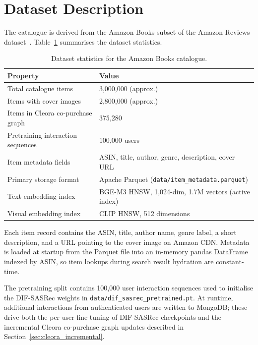\section{Dataset Description}
\label{sec:app_dataset}

The catalogue is derived from the Amazon Books subset of the Amazon Reviews dataset~\cite{ni2019justifying}.
Table~\ref{tab:app_dataset_stats} summarises the dataset statistics.

\begin{table}[H]
\centering
\caption{Dataset statistics for the Amazon Books catalogue.}
\label{tab:app_dataset_stats}
\begin{tabular}{p{6.5cm} p{8.0cm}}
\hline
\textbf{Property} & \textbf{Value} \\
\hline
Total catalogue items & 3{,}000{,}000 (approx.) \\
Items with cover images & 2{,}800{,}000 (approx.) \\
Items in Cleora co-purchase graph & 375{,}280 \\
Pretraining interaction sequences & 100{,}000 users \\
Item metadata fields & ASIN, title, author, genre, description, cover URL \\
Primary storage format & Apache Parquet (\nolinkurl{data/item_metadata.parquet}) \\
Text embedding index & BGE-M3 HNSW, 1{,}024-dim, 1.7M vectors (active index) \\
Visual embedding index & CLIP HNSW, 512 dimensions \\
\hline
\end{tabular}
\end{table}

Each item record contains the ASIN, title, author name, genre label, a short description, and a URL pointing to the cover image on Amazon CDN.
Metadata is loaded at startup from the Parquet file into an in-memory pandas DataFrame indexed by ASIN, so item lookups during search result hydration are constant-time.

The pretraining split contains 100{,}000 user interaction sequences used to initialise the DIF-SASRec weights in \nolinkurl{data/dif_sasrec_pretrained.pt}.
At runtime, additional interactions from authenticated users are written to MongoDB; these drive both the per-user fine-tuning of DIF-SASRec checkpoints and the incremental Cleora co-purchase graph updates described in Section~\ref{sec:cleora_incremental}.
